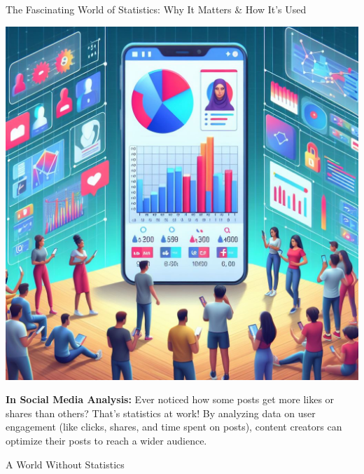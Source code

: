 \documentclass[final]{beamer}
\begin{document}
\begin{frame}[t]{}
\begin{columns}[t]
\begin{column}{.33\textwidth}
\begin{block}{The Fascinating World of Statistics: Why It Matters \& How It's Used}
				\begin{minipage}{0.3\textwidth}
					\centering
					\includegraphics[width=0.88\linewidth]{./images/2-2-3-SocialMedia.jpeg}
				\end{minipage}
				\hfill
				\begin{minipage}{0.68\textwidth}
					\textbf{In Social Media Analysis:}  Ever noticed how some posts get more likes or shares than others? That's statistics at work! By analyzing data on user engagement (like clicks, shares, and time spent on posts), content creators can optimize their posts to reach a wider audience.
				\end{minipage}

				\vspace{1cm}

			\end{block}

			\vspace{0.5cm}
			
			\begin{block}{A World Without Statistics}
				
				\vspace{1cm}
				

\end{block}
\end{column}
\end{columns}
\end{frame}
\end{document}
